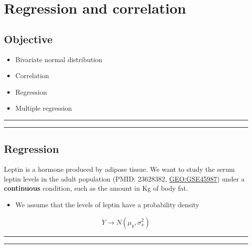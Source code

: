 \documentclass[
]{book}
\providecommand{\tightlist}{%
  \setlength{\itemsep}{0pt}\setlength{\parskip}{0pt}}
\begin{document}
\hypertarget{regression-and-correlation}{%
\chapter{Regression and correlation}\label{regression-and-correlation}}

\hypertarget{objective-17}{%
\section{Objective}\label{objective-17}}

\begin{itemize}
\tightlist
\item
  Bivariate normal distribution
\item
  Correlation
\item
  Regression
\item
  Multiple regression
\end{itemize}

\begin{center}\rule{0.5\linewidth}{0.5pt}\end{center}

\begin{center}\rule{0.5\linewidth}{0.5pt}\end{center}

\hypertarget{regression}{%
\section{Regression}\label{regression}}

Leptin is a hormone produced by adipose tissue. We want to study the serum leptin levels in the adult population (PMID: 23628382, \url{GEO:GSE45987}) under a \textbf{continuous} condition, such as the amount in Kg of body fat.

\begin{itemize}
\tightlist
\item
  We assume that the levels of leptin have a probability density
\end{itemize}

\[Y \rightarrow N(\mu_y, \sigma_x^2)\]

\begin{center}\rule{0.5\linewidth}{0.5pt}\end{center}

\begin{center}\rule{0.5\linewidth}{0.5pt}\end{center}
\end{document}
